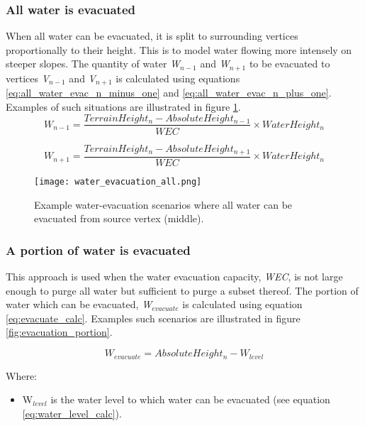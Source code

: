 \subsubsection{All water is evacuated}

When all water can be evacuated, it is split to surrounding vertices proportionally to their height. This is to model water flowing more intensely on steeper slopes. The quantity of water \textit{W$_{n-1}$} and \textit{W$_{n+1}$} to be evacuated to vertices \textit{V$_{n-1}$} and \textit{V$_{n+1}$} is calculated using equations \ref{eq:all_water_evac_n_minus_one} and \ref{eq:all_water_evac_n_plus_one}. Examples of such situations are illustrated in figure \ref{fig:evacuation_all}. \\

\begin{equation}\label{eq:all_water_evac_n_minus_one}
W_{n-1} = \frac{TerrainHeight_{n} - AbsoluteHeight_{n-1}}{WEC} \times WaterHeight_{n}
\end{equation}

\begin{equation}\label{eq:all_water_evac_n_plus_one}
W_{n+1} = \frac{TerrainHeight_{n} - AbsoluteHeight_{n+1}}{WEC} \times WaterHeight_{n}
\end{equation}

\begin{figure}
\center
	\texttt{[image: water\_evacuation\_all.png]}
	\caption{ Example water-evacuation scenarios where all water can be evacuated from source vertex (middle).}
	\label{fig:evacuation_all}
\end{figure}

\subsubsection{A portion of water is evacuated}

This approach is used when the water evacuation capacity, \textit{WEC}, is not large enough to purge all water but sufficient to purge a subset thereof. The portion of water which can be evacuated, \textit{W$_{evacuate}$} is calculated using equation \ref{eq:evacuate_calc}. Examples such scenarios are illustrated in figure \ref{fig:evacuation_portion}.

\begin{equation}\label{eq:evacuate_calc}
	W_{evacuate} = AbsoluteHeight_{n} - W_{level}
\end{equation}

Where:
\begin{itemize}
 \item W$_{level}$ is the water level to which water can be evacuated (see equation \ref{eq:water_level_calc}).
\end{itemize}

